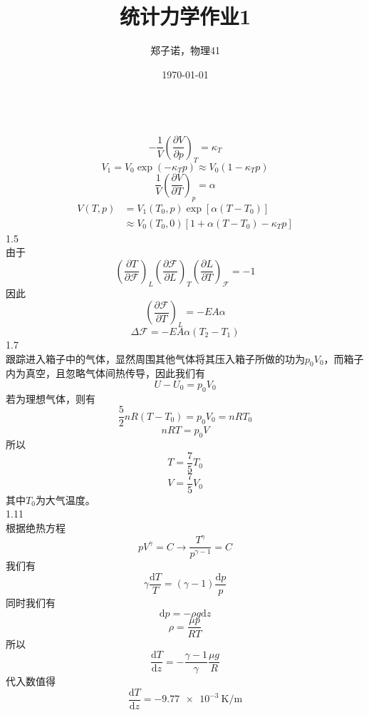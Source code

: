 \documentclass[utf8]{ctexart}
\title{统计力学作业1}
\author{郑子诺，物理41}
\date{\today}
\begin{document}
\maketitle
{}\\
\[-\frac{1}{V}\left(\frac{\partial V}{\partial p}\right)_T=\kappa_T\]
\[V_1=V_0\exp(-\kappa_Tp)\approx V_0(1-\kappa_Tp)\]
\[\frac{1}{V}\left(\frac{\partial V}{\partial T}\right)_p=\alpha\]
\begin{align*}
	V(T,p)&=V_1(T_0,p)\exp[\alpha(T-T_0)]\\
	&\approx V_0(T_0,0)[1+\alpha(T-T_0)-\kappa_Tp]
\end{align*}
1.5\\
由于
\[\left(\frac{\partial T}{\partial\mathcal{F}}\right)_L\left(\frac{\partial\mathcal{F}}{\partial L}\right)_T\left(\frac{\partial L}{\partial T}\right)_\mathcal{F}=-1\]
因此
\[\left(\frac{\partial\mathcal{F}}{\partial T}\right)_L=-EA\alpha\]
\[\Delta\mathcal{F}=-EA\alpha(T_2-T_1)\]
1.7\\
跟踪进入箱子中的气体，显然周围其他气体将其压入箱子所做的功为$p_0V_0$，而箱子内为真空，且忽略气体间热传导，因此我们有
\[U-U_0=p_0V_0\]
若为理想气体，则有
\[\frac{5}{2}nR(T-T_0)=p_0V_0=nRT_0\]
\[nRT=p_0V\]
所以
\[T=\frac{7}{5}T_0\]
\[V=\frac{7}{5}V_0\]
其中$T_0$为大气温度。\\
1.11\\
根据绝热方程
\[pV^\gamma=C\rightarrow\frac{T^\gamma}{p^{\gamma-1}}=C\]
我们有
\[\gamma\frac{\mathrm{d}T}{T}=(\gamma-1)\frac{\mathrm{d}p}{p}\]
同时我们有
\[\mathrm{d}p=-\rho g\mathrm{d}z\]
\[\rho=\frac{\mu p}{RT}\]
所以
\[\frac{\mathrm{d}T}{\mathrm{d}z}=-\frac{\gamma-1}{\gamma}\frac{\mu g}{R}\]
代入数值得
\[\frac{\mathrm{d}T}{\mathrm{d}z}=\qty[per-mode=symbol]{-9.77e-3}{\kelvin\per\meter}\]
\end{document}
